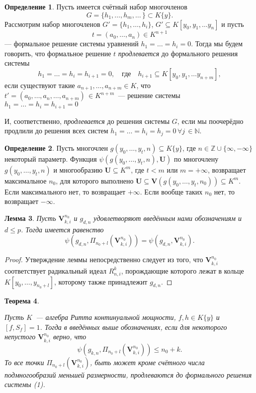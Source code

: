 \documentclass[16pt]{article}
\theoremstyle{plain}
\newtheorem{theorem}{Теорема}
\newtheorem{lemma}[theorem]{Лемма}
\theoremstyle{definition}
\newtheorem{definition}[theorem]{Определение}
\theoremstyle{remark}
\begin{document}
\begin{definition}
Пусть имеется счётный набор многочленов
$$
G=\{h_1,\ldots,h_m,\ldots\,\}\subset K\{y\}.
$$
Рассмотрим набор многочленов $G'=\{h_1,\ldots,h_i\}$, $G'\subseteq K[y_0,y_1,\ldots
y_n]$ и пусть
$$
t=(a_0,\ldots,a_n)\in K^{n+1}
$$
--- формальное решение системы уравнений $h_1=\ldots=h_i=0$. Тогда мы будем говорить, что формальное решение
$t$ {\it продлевается} до формального решения системы
$$
h_1=\ldots=h_i=h_{i+1}=0, \quad\mbox{где}\quad h_{i+1}\subseteq K[y_0,y_1,\ldots
y_{n+m}],
$$
если существуют такие $a_{n+1},\ldots, a_{n+m}\in K$, что
$t'=(a_0,\ldots,a_n,\ldots,a_{n+m})\,\in K^{n+m}$~--- решение
системы $h_1=\ldots=h_i=h_{i+1}=0$

И, соответственно, {\it продлевается} до решения системы $G$, если
мы поочерёдно продлили до решения всех систем $h_1=\ldots=h_i=h_{j}=0\, \forall j\,\in \mathbb{N}$.
\end{definition}



\begin{definition}
Пусть многочлен $g(y_0,\ldots,y_t,n)\subseteq K\{y\}$, где $n\in \mathbb{Z}\cup\{\infty,-\infty\}$ некоторый параметр. Функция $\psi(g(y_0,\ldots,y_t,n),\mathbf{U})$ по многочлену $g(y_0,\ldots,y_t,n)$ и  многообразию $\mathbf{U}\subseteq K^m$, где $t< m$ или $m=+\infty$, возвращает максимальное $n_0$, для которого выполнено $\mathbf{U}\subseteq \mathbf{V}(g(y_0,\ldots,y_t,n_0))\subseteq K^m$. Если максимального нет, то возвращает $+\infty$. Если вообще таких  $n_0$ нет, то возвращает $-\infty$.
\end{definition}

\begin{lemma}\label{lemma:o_ravenste_psi}
Пусть $\mathbf{V}_{k,i}^{n_0}$ и $g_{d,n}$ удовлетворяют введённым нами обозначениям и  $d\leqslant p$. Тогда имеется равенство $$\psi(g_{d,n},\Pi_{n_0+l}(\mathbf{V}_{k,i}^{n_0}))=\psi(g_{d,n},\mathbf{V}_{k,i}^{n_0}).$$
\end{lemma}

\begin{proof}
Утверждение леммы непосредственно следует из того, что $\mathbf{V}_{k,i}^{n_0}$ соответствует радикальный идеал $R_{n,i}^k$, порождающие которого лежат в кольце $K[y_0,\ldots,y_{n_0+l}]$, которому также принадлежит $g_{d,n}$.
\end{proof}


\begin{theorem}\label{theorem:general th1}

Пусть $K$~--- алгебра Ритта континуальной мощности, $f,h\in K\{y\}$ и $[f,S_f]=1$. Тогда в введённых выше обозначениях, если для некоторого непустого $\mathbf{V}_{k,i}^{n_0}$ верно, что
\begin{equation}
\psi(g_{k,n},\Pi_{n_0+l}(\mathbf{V}_{k,i}^{n_0}))\leqslant n_0+k.
\end{equation}
То все точки $\Pi_{n_0+l}(\mathbf{V}_{k,i}^{n_0})$, быть может кроме счётного числа подмногообразий меньшей размерности, продлеваются до формального решения системы (1).
\end{theorem}
\end{document}
